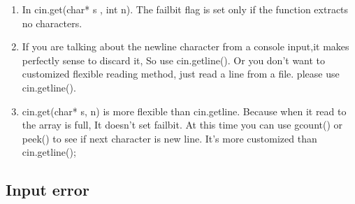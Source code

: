 \documentclass[a4paper,12pt,twoside]{book}
\begin{document}
\begin{itemize}
\begin{enumerate}
		\item In cin.get(char* s ,  int n). The failbit flag is set only if the function extracts no characters.
		
		\item If you are talking about the newline character from a console input,it makes perfectly sense to discard it, So use cin.getline(). Or you don't want to customized flexible reading method, just read a line from a file. please use cin.getline().
		
		\item cin.get(char* s, n) is more flexible than cin.getline. Because when it read to the array is full, It doesn't set failbit. At this time you can use gcount() or peek() to see if next character is new line. It's more customized than  cin.getline();
	\end{enumerate}
	
\end{itemize}

\subsection{Input error}
\end{document}
